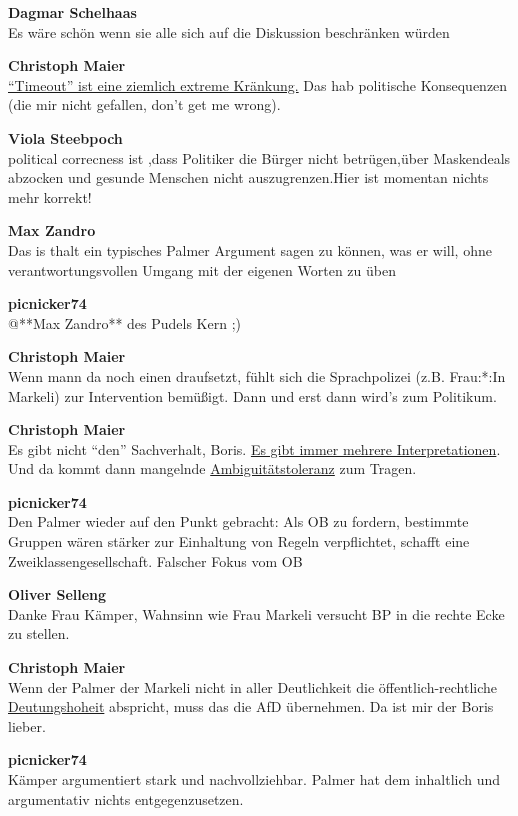 \documentclass[]{article}
\begin{document}
\textbf{Dagmar Schelhaas}\\
​Es wäre schön wenn sie alle sich auf die Diskussion beschränken würden

\textbf{Christoph Maier}\\
​\protect\hyperlink{timeout}{``Timeout'' ist eine ziemlich extreme
Kränkung.} Das hab politische Konsequenzen (die mir nicht gefallen,
don't get me wrong).

\textbf{Viola Steebpoch}\\
​political correcness ist ,dass Politiker die Bürger nicht betrügen,über
Maskendeals abzocken und gesunde Menschen nicht auszugrenzen.Hier ist
momentan nichts mehr korrekt!

\textbf{Max Zandro}\\
​Das is thalt ein typisches Palmer Argument sagen zu können, was er
will, ohne verantwortungsvollen Umgang mit der eigenen Worten zu üben

\textbf{picnicker74}\\
​@**Max Zandro** des Pudels Kern ;)

\textbf{Christoph Maier}\\
​Wenn mann da noch einen draufsetzt, fühlt sich die Sprachpolizei (z.B.
Frau:*:In Markeli) zur Intervention bemüßigt. Dann und erst dann wird's
zum Politikum.

\textbf{Christoph Maier}\\
​Es gibt nicht ``den'' Sachverhalt, Boris.
\protect\hyperlink{Calliope-Collapse}{Es gibt immer mehrere
Interpretationen}. Und da kommt dann mangelnde
\protect\hyperlink{Ambiguitaetstoleranz}{Ambiguitätstoleranz} zum
Tragen.

\textbf{picnicker74}\\
​Den Palmer wieder auf den Punkt gebracht: Als OB zu fordern, bestimmte
Gruppen wären stärker zur Einhaltung von Regeln verpflichtet, schafft
eine Zweiklassengesellschaft. Falscher Fokus vom OB

\textbf{Oliver Selleng}\\
​Danke Frau Kämper, Wahnsinn wie Frau Markeli versucht BP in die rechte
Ecke zu stellen.

\textbf{Christoph Maier}\\
​Wenn der Palmer der Markeli nicht in aller Deutlichkeit die
öffentlich-rechtliche \protect\hyperlink{Deutungshoheit}{Deutungshoheit}
abspricht, muss das die AfD übernehmen. Da ist mir der Boris lieber.

\textbf{picnicker74}\\
​Kämper argumentiert stark und nachvollziehbar. Palmer hat dem
inhaltlich und argumentativ nichts entgegenzusetzen.
\end{document}
